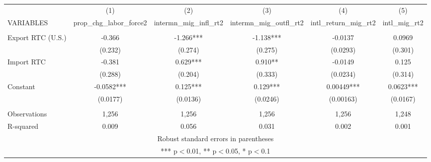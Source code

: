 \begin{tabular}{lccccc} \hline
 & (1) & (2) & (3) & (4) & (5) \\
VARIABLES & prop\_chg\_labor\_force2 & intermn\_mig\_infl\_rt2 & intermn\_mig\_outfl\_rt2 & intl\_return\_mig\_rt2 & intl\_mig\_rt2 \\ \hline
 &  &  &  &  &  \\
Export RTC (U.S.) & -0.366 & -1.266*** & -1.138*** & -0.0137 & 0.0969 \\
 & (0.232) & (0.274) & (0.275) & (0.0293) & (0.301) \\
Import RTC & -0.381 & 0.629*** & 0.910** & -0.0149 & 0.125 \\
 & (0.288) & (0.204) & (0.333) & (0.0234) & (0.314) \\
Constant & -0.0582*** & 0.125*** & 0.129*** & 0.00449*** & 0.0623*** \\
 & (0.0177) & (0.0136) & (0.0246) & (0.00163) & (0.0167) \\
 &  &  &  &  &  \\
Observations & 1,256 & 1,256 & 1,256 & 1,256 & 1,248 \\
 R-squared & 0.009 & 0.056 & 0.031 & 0.002 & 0.001 \\ \hline
\multicolumn{6}{c}{ Robust standard errors in parentheses} \\
\multicolumn{6}{c}{ *** p$<$0.01, ** p$<$0.05, * p$<$0.1} \\
\end{tabular}
